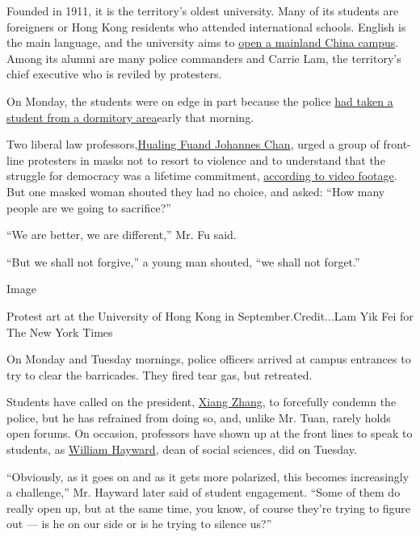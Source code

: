 Founded in 1911, it is the territory's oldest university. Many of its
students are foreigners or Hong Kong residents who attended
international schools. English is the main language, and the university
aims to
\href{https://www.sppoweb.hku.hk/sdplan/eng/the-enabling-platform/enhancing-ou-mainland-presence.php}{open
a mainland China campus}. Among its alumni are many police commanders
and Carrie Lam, the territory's chief executive who is reviled by
protesters.

On Monday, the students were on edge in part because the police
\href{https://www.hongkongfp.com/2019/11/11/video-hong-kong-police-pepper-spray-hku-students-following-arrest-near-residential-halls/}{had
taken a student from a dormitory area}early that morning.

Two liberal law
professors,\href{https://news.rthk.hk/rthk/en/component/k2/1491306-20191111.htm}{}\href{https://news.rthk.hk/rthk/en/component/k2/1491306-20191111.htm}{Hualing
Fu}\href{https://news.rthk.hk/rthk/en/component/k2/1491306-20191111.htm}{and
Johannes Chan}, urged a group of front-line protesters in masks not to
resort to violence and to understand that the struggle for democracy was
a lifetime commitment,
\href{https://twitter.com/maryhui/status/1193726398864576512}{according
to video footage}. But one masked woman shouted they had no choice, and
asked: ``How many people are we going to sacrifice?''

``We are better, we are different,'' Mr. Fu said.

``But we shall not forgive,'' a young man shouted, ``we shall not
forget.''

Image

Protest art at the University of Hong Kong in September.Credit...Lam Yik
Fei for The New York Times

On Monday and Tuesday mornings, police officers arrived at campus
entrances to try to clear the barricades. They fired tear gas, but
retreated.

Students have called on the president,
\href{https://presidentoffice.hku.hk/}{Xiang Zhang}, to forcefully
condemn the police, but he has refrained from doing so, and, unlike Mr.
Tuan, rarely holds open forums. On occasion, professors have shown up at
the front lines to speak to students, as
\href{http://www.socsc.hku.hk/bio/Hayward.htm}{William Hayward}, dean of
social sciences, did on Tuesday.

``Obviously, as it goes on and as it gets more polarized, this becomes
increasingly a challenge,'' Mr. Hayward later said of student
engagement. ``Some of them do really open up, but at the same time, you
know, of course they're trying to figure out --- is he on our side or is
he trying to silence us?''

